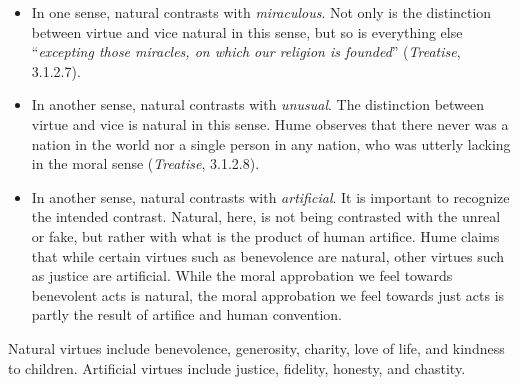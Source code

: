 \begin{itemize}
    \item In one sense, natural contrasts with \emph{miraculous}. Not only is the distinction between virtue and vice natural in this sense, but so is everything else ``\emph{excepting those miracles, on which our religion is founded}'' (\emph{Treatise}, 3.1.2.7).
    \item In another sense, natural contrasts with \emph{unusual}. The distinction between virtue and vice is natural in this sense. Hume observes that there never was a nation in the world nor a single person in any nation, who was utterly lacking in the moral sense (\emph{Treatise}, 3.1.2.8).
    \item In another sense, natural contrasts with \emph{artificial}. It is important to recognize the intended contrast. Natural, here, is not being contrasted with the unreal or fake, but rather with what is the product of human artifice. Hume claims that while certain virtues such as benevolence are natural, other virtues such as justice are artificial. While the moral approbation we feel towards benevolent acts is natural, the moral approbation we feel towards just acts is partly the result of artifice and human convention.
\end{itemize}

Natural virtues include benevolence, generosity, charity, love of life, and kindness to children. Artificial virtues include justice, fidelity, honesty, and chastity.


